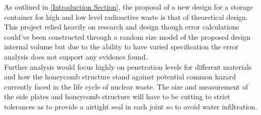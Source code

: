 As outlined in \cref{Introduction Section}, the proposal of a new design for a storage container for high and low level radioactive waste is that of theoretical design. This project relied heavily on research and design though error calculations could've been constructed through a random size model of the proposed design internal volume but due to the ability to have varied specification the error analysis does not support any evidence found. \\

Further analysis would focus highly on penetration levels for different materials and how the honeycomb structure stand against potential common hazard currently faced in the life cycle of nuclear waste. The size and measurement of the side plates and honeycomb structure will have to be cutting to strict tolerances as to provide a airtight seal in each joint so to avoid water infiltration.